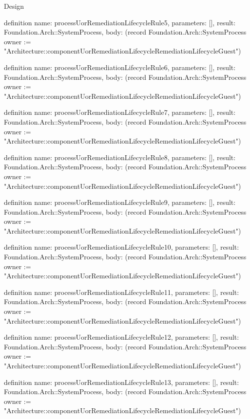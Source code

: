 \begin{lexlean}{Design}
\begin{semanticmodule}
definition{
  name: processUorRemediationLifecycleRule5,
  parameters: [],
  result: Foundation.Arch::SystemProcess,
  body: (record Foundation.Arch::SystemProcess {owner := "Architecture::componentUorRemediationLifecycleRemediationLifecycleGuest"})
}

definition{
  name: processUorRemediationLifecycleRule6,
  parameters: [],
  result: Foundation.Arch::SystemProcess,
  body: (record Foundation.Arch::SystemProcess {owner := "Architecture::componentUorRemediationLifecycleRemediationLifecycleGuest"})
}

definition{
  name: processUorRemediationLifecycleRule7,
  parameters: [],
  result: Foundation.Arch::SystemProcess,
  body: (record Foundation.Arch::SystemProcess {owner := "Architecture::componentUorRemediationLifecycleRemediationLifecycleGuest"})
}

definition{
  name: processUorRemediationLifecycleRule8,
  parameters: [],
  result: Foundation.Arch::SystemProcess,
  body: (record Foundation.Arch::SystemProcess {owner := "Architecture::componentUorRemediationLifecycleRemediationLifecycleGuest"})
}

definition{
  name: processUorRemediationLifecycleRule9,
  parameters: [],
  result: Foundation.Arch::SystemProcess,
  body: (record Foundation.Arch::SystemProcess {owner := "Architecture::componentUorRemediationLifecycleRemediationLifecycleGuest"})
}

definition{
  name: processUorRemediationLifecycleRule10,
  parameters: [],
  result: Foundation.Arch::SystemProcess,
  body: (record Foundation.Arch::SystemProcess {owner := "Architecture::componentUorRemediationLifecycleRemediationLifecycleGuest"})
}

definition{
  name: processUorRemediationLifecycleRule11,
  parameters: [],
  result: Foundation.Arch::SystemProcess,
  body: (record Foundation.Arch::SystemProcess {owner := "Architecture::componentUorRemediationLifecycleRemediationLifecycleGuest"})
}

definition{
  name: processUorRemediationLifecycleRule12,
  parameters: [],
  result: Foundation.Arch::SystemProcess,
  body: (record Foundation.Arch::SystemProcess {owner := "Architecture::componentUorRemediationLifecycleRemediationLifecycleGuest"})
}

definition{
  name: processUorRemediationLifecycleRule13,
  parameters: [],
  result: Foundation.Arch::SystemProcess,
  body: (record Foundation.Arch::SystemProcess {owner := "Architecture::componentUorRemediationLifecycleRemediationLifecycleGuest"})
}


\end{semanticmodule}
\end{lexlean}

